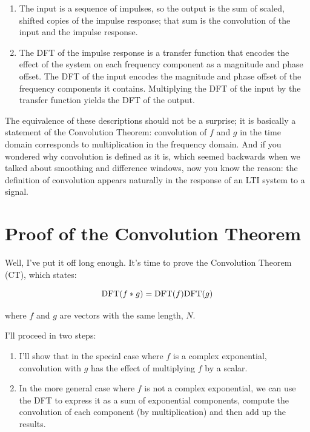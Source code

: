 \documentclass[12pt]{book}
\begin{document}
\begin{enumerate}

\item The input is a sequence of impulses, so the output is the sum of
  scaled, shifted copies of the impulse response; that sum is the
  convolution of the input and the impulse response.

\item The DFT of the impulse response is a transfer function that
  encodes the effect of the system on each frequency component as a
  magnitude and phase offset.  The DFT of the input encodes the
  magnitude and phase offset of the frequency components it contains.
  Multiplying the DFT of the input by the transfer function yields
  the DFT of the output.

\end{enumerate}

The equivalence of these descriptions should not be a surprise;
it is basically a statement of the Convolution Theorem:
convolution of $f$ and $g$ in the time
domain corresponds to multiplication in the frequency domain.
And if you wondered why convolution is defined as it is, which
seemed backwards when we talked about smoothing and difference
windows, now you know the reason: the definition of convolution
appears naturally in the response of an LTI system to a signal.


\section{Proof of the Convolution Theorem}

Well, I've put it off long enough.  It's time to prove the Convolution
Theorem (CT), which states:

\[ \mathrm{DFT}(f \ast g) = \mathrm{DFT}(f) \mathrm{DFT}(g) \]

where $f$ and $g$ are vectors with the same length, $N$.

I'll proceed in two steps:

\begin{enumerate}

\item I'll show that in the special case where $f$ is a complex
exponential, convolution with $g$ has the effect of multiplying
$f$ by a scalar.  

\item In the more general case where $f$ is not a complex exponential,
we can use the DFT to express it as a sum of exponential components,
compute the convolution of each component (by multiplication) and
then add up the results.

\end{enumerate}
\end{document}
